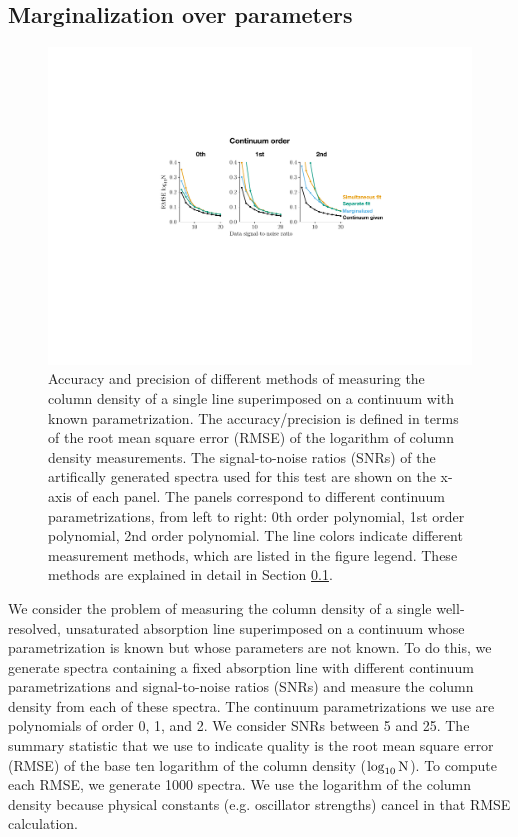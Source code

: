\documentclass[manuscript]{aastex62}
\begin{document}
\subsection{Marginalization over parameters}
\label{sec:marginalization-over-parameters}

\begin{figure}
  \includegraphics[width=\linewidth]{figures/marginalized_unmarginalized_labeled.pdf}
  \caption{
  Accuracy and precision of different methods of measuring the column density of a single line superimposed on a continuum with known parametrization.
  The accuracy/precision is defined in terms of the root mean square error (RMSE) of the logarithm of column density measurements.
  The signal-to-noise ratios (SNRs) of the artifically generated spectra used for this test are shown on the x-axis of each panel.
  The panels correspond to different continuum parametrizations, from left to right: 0th order polynomial, 1st order polynomial, 2nd order polynomial.
  The line colors indicate different measurement methods, which are listed in the figure legend.
  These methods are explained in detail in Section \ref{sec:marginalization-over-parameters}.}
  \label{fig:order-known-comparison}
\end{figure}

We consider the problem of measuring the column density of a single well-resolved, unsaturated absorption line superimposed on a continuum whose parametrization is known but whose parameters are not known.
To do this, we generate spectra containing a fixed absorption line with different continuum parametrizations and signal-to-noise ratios (SNRs) and measure the column density from each of these spectra.
The continuum parametrizations we use are polynomials of order 0, 1, and 2.
We consider SNRs between 5 and 25.
The summary statistic that we use to indicate quality is the root mean square error (RMSE) of the base ten logarithm of the column density ($\log_{10}{\rm N}$).
To compute each RMSE, we generate 1000 spectra.
We use the logarithm of the column density because physical constants (e.g. oscillator strengths) cancel in that RMSE calculation.
\end{document}
